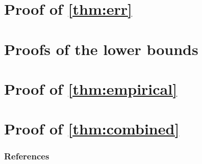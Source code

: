 \documentclass{article}
\begin{document}
\newpage

\appendix

\begin{bibunit}[myunsrt]
  \section{Proof of \cref{thm:err}}\label{app:upper}
  

  \section{Proofs of the lower bounds}\label{app:lower}
  

  \section{Proof of \cref{thm:empirical}}\label{app:empirical}
  

  \section{Proof of \cref{thm:combined}}\label{app:combined}
  

  \subsubsection*{References}
  {\def\section*#1{}\small\putbib[all]}
\end{bibunit}
\end{document}
